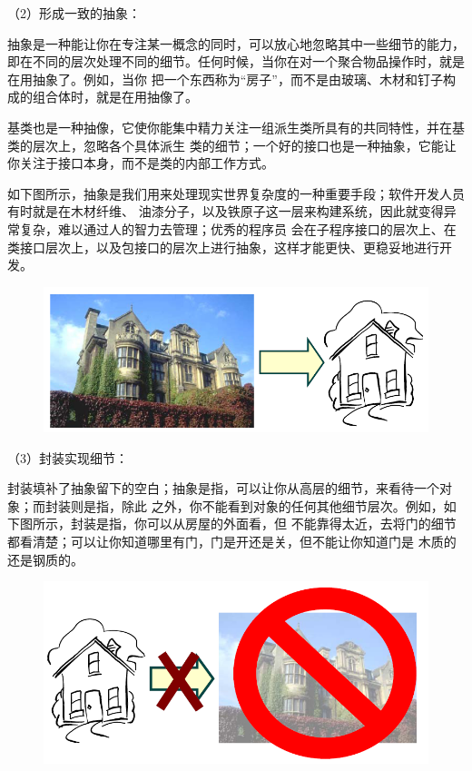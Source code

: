 \documentclass{article}
\begin{document}
\par
（2）形成一致的抽象：
\par
抽象是一种能让你在专注某一概念的同时，可以放心地忽略其中一些细节的能力，
即在不同的层次处理不同的细节。任何时候，当你在对一个聚合物品操作时，就是在用抽象了。例如，当你
把一个东西称为“房子”，而不是由玻璃、木材和钉子构成的组合体时，就是在用抽像了。
\par
基类也是一种抽像，它使你能集中精力关注一组派生类所具有的共同特性，并在基类的层次上，忽略各个具体派生
类的细节；一个好的接口也是一种抽象，它能让你关注于接口本身，而不是类的内部工作方式。
\par
如下图所示，抽象是我们用来处理现实世界复杂度的一种重要手段；软件开发人员有时就是在木材纤维、
油漆分子，以及铁原子这一层来构建系统，因此就变得异常复杂，难以通过人的智力去管理；优秀的程序员
会在子程序接口的层次上、在类接口层次上，以及包接口的层次上进行抽象，这样才能更快、更稳妥地进行开发。
\begin{figure}[ht]
    \centering
    \includegraphics[width=15cm]{figure6.png}
\end{figure}

\par
（3）封装实现细节：
\par
封装填补了抽象留下的空白；抽象是指，可以让你从高层的细节，来看待一个对象；而封装则是指，除此
之外，你不能看到对象的任何其他细节层次。例如，如下图所示，封装是指，你可以从房屋的外面看，但
不能靠得太近，去将门的细节都看清楚；可以让你知道哪里有门，门是开还是关，但不能让你知道门是
木质的还是钢质的。
\begin{figure}[ht]
    \centering
    \includegraphics[width=15cm]{figure7.png}
\end{figure}
\end{document}
